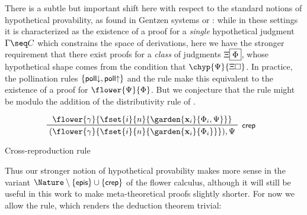 There is a subtle but important shift here with respect to the standard notions
of hypothetical provability, as found in Gentzen systems or : while
in these settings it is characterized as the existence of a proof for a
\emph{single} hypothetical judgment $\Gamma \seq C$ which constrains the space
of derivations, here we have the stronger requirement that there exist proofs
for a \emph{class} of judgments $\Xi\fbox{$\Phi$}$, whose hypothetical shape
comes from the condition that $\chyp{\Psi}{\Xi\hole}$. In practice, the
pollination rules $\{\text{\text{\small$\mathsf{poll{\downarrow}}$}}, \text{\text{\small$\mathsf{poll{\uparrow}}$}}\}$ and
the {} rule make this equivalent to the existence of a proof for
$\flower{\Psi}{\Phi}$. But we conjecture that the {} rule might be
 modulo the addition of the distributivity rule
 of .

\begin{marginfigure}
  $$
  \R[\rsf{crep}]
    {\flower{\gamma}{\fset{i}{n}{\garden{\bx_i}{\Phi_i, \Psi}}}}
    {(\flower{\gamma}{\fset{i}{n}{\garden{\bx_i}{\Phi_i}}}), \Psi}
  $$
  \caption{Cross-reproduction rule}
\end{marginfigure}

Thus our stronger notion of hypothetical provability makes more sense in the
variant $\Nature \setminus \{\rsf{epis}\} \cup \{\rsf{crep}\}$ of the
flower calculus, although it will still be useful in this work to make
meta-theoretical proofs slightly shorter. For now we allow the
{} rule, which renders the deduction theorem trivial:

